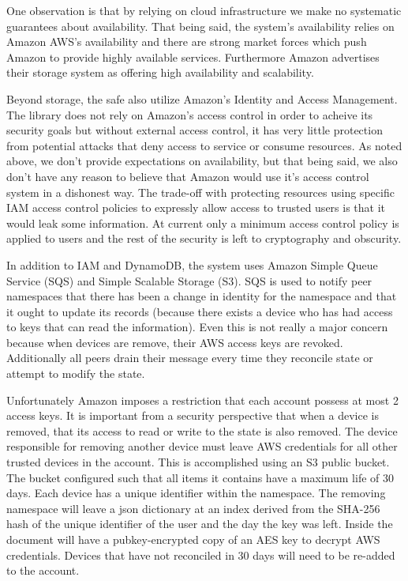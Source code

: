 One observation is that by relying on cloud infrastructure we make no systematic guarantees about availability. 
That being said, the system's availability relies on Amazon AWS's availability and there are strong market forces which push Amazon to provide highly available services. 
Furthermore Amazon advertises their storage system as offering high availability and scalability\cite{dynamodb}.

Beyond storage, the safe also utilize Amazon's Identity and Access Management. 
The library does not rely on Amazon's access control in order to acheive its security goals but without
external access control, it has very little protection from potential attacks that deny access to service or consume resources.
As noted above, we don't provide expectations on availability, but that being said, we also don't have any reason to believe that Amazon would use it's access control system in a dishonest way. The trade-off with protecting resources using specific IAM access control policies to expressly allow access to trusted users is that it would leak some information. 
At current only a minimum access control policy is applied to users and the rest of the security is left to cryptography and obscurity. 

In addition to IAM and DynamoDB, the system uses Amazon Simple Queue Service (SQS) and Simple Scalable Storage (S3). SQS is used to notify peer namespaces that there has been a change in identity for the namespace and that it ought to update its records (because there exists a device who has had access to keys that can read the information). 
Even this is not really a major concern because when devices are remove, their AWS access keys are revoked. 
Additionally all peers drain their message every time they reconcile state or attempt to modify the state.

Unfortunately Amazon imposes a restriction that each account possess at most 2 access keys. 
It is important from a security perspective that when a device is removed, that its access to read or write to the state is also removed. 
The device responsible for removing another device must leave AWS credentials for all other trusted devices in the account. This is accomplished using an S3 public bucket. The bucket configured such that all items it contains have a maximum life of 30 days.
Each device has a unique identifier within the namespace. The removing namespace will leave a json dictionary at an index derived from the SHA-256 hash of the unique identifier of the user and the day the key was left. Inside the document will have a pubkey-encrypted copy of an AES key to decrypt AWS credentials.
Devices that have not reconciled in 30 days will need to be re-added to the account.

